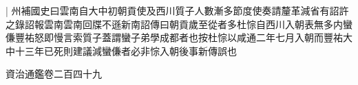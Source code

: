 |{
	州補國史曰雲南自大中初朝貢使及西川質子人數漸多節度使奏請釐革減省有詔許之錄詔報雲南雲南回牒不遜新南詔傳曰朝貢歲至從者多杜悰自西川入朝表無多内蠻傔豐祐怒即慢言索質子蓋謂蠻子弟學成都者也按杜悰以咸通二年七月入朝而豐祐大中十三年已死則建議減蠻傔者必非悰入朝後事新傳誤也}


資治通鑑卷二百四十九
















































































































































